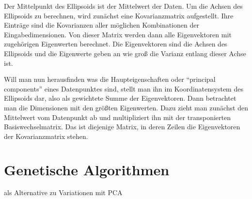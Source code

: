 Der Mittelpunkt des Ellipsoids ist der Mittelwert der Daten.
 Um die Achsen des Ellipsoids zu berechnen, wird zunächst eine Kovarianzmatrix aufgestellt. Ihre Einträge sind die Kovarianzen aller möglichen Kombinationen der Eingabedimensionen. Von dieser Matrix werden dann alle Eigenvektoren mit zugehörigen Eigenwerten berechnet.
 Die Eigenvektoren sind die Achsen des Ellipsoids und die Eigenwerte geben an wie groß die Varianz entlang dieser Achse ist.
 
 Will man nun herausfinden was die Haupteigenschaften oder "`principal components"' eines Datenpunktes sind, stellt man ihn im Koordinatensystem des Ellipsoids dar, also als gewichtete Summe der Eigenvektoren. Dann betrachtet man die Dimensionen mit den größten Eigenwerten. Dazu zieht man zunächst den Mittelwert vom Datenpunkt ab und multipliziert ihn mit der transponierten Basiswechselmatrix. Das ist diejenige Matrix, in deren Zeilen die Eigenvektoren der Kovarianzmatrix stehen.


\section{Genetische Algorithmen}

als Alternative zu Variationen mit PCA

